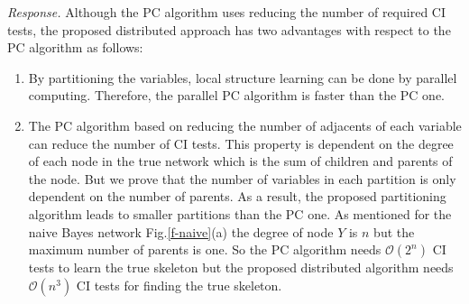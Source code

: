\documentclass{article}
\newcommand{\Oo}{\mathcal{O}}
\begin{document}
\emph{Response.} Although the PC algorithm uses reducing the number of required CI tests, the proposed distributed approach has two advantages with respect to the PC algorithm as follows:
\begin{enumerate}
    \item By partitioning the variables,  local structure learning can be done by parallel computing. Therefore, the parallel PC algorithm is faster than the PC one.
    \item The PC algorithm based on reducing the number of adjacents of each variable can reduce the number of CI tests. This property is dependent on the degree of each node in the true network which is the sum of children and parents of the node. But we prove that the number of variables in each partition is only dependent on the number of parents. As a result, the proposed partitioning algorithm leads to smaller partitions than the PC one. As mentioned for the naive Bayes network Fig.\ref{f-naive}(a) the degree of node $Y$ is $n$ but the maximum number of parents is one.
    So the PC algorithm needs $\Oo(2^n)$ CI tests to learn the true skeleton but the proposed distributed algorithm needs $\Oo(n^3)$ CI tests for finding the true skeleton.

    
\end{enumerate}
\end{document}
